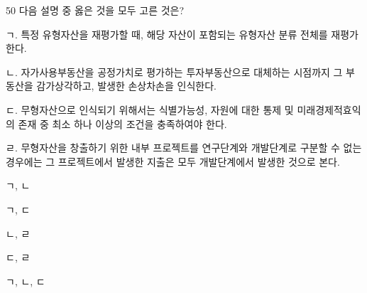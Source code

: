 \begin{question}{50}
다음 설명 중 옳은 것을 모두 고른 것은?
\begin{framedtext}
ㄱ. 특정 유형자산을 재평가할 때, 해당 자산이 포함되는 유형자산 분류 전체를 재평가한다. \par
ㄴ. 자가사용부동산을 공정가치로 평가하는 투자부동산으로 대체하는 시점까지 그 부동산을 감가상각하고, 발생한 손상차손을 인식한다. \par
ㄷ. 무형자산으로 인식되기 위해서는 식별가능성, 자원에 대한 통제 및 미래경제적효익의 존재 중 최소 하나 이상의 조건을 충족하여야 한다. \par
ㄹ. 무형자산을 창출하기 위한 내부 프로젝트를 연구단계와 개발단계로 구분할 수 없는 경우에는 그 프로젝트에서 발생한 지출은 모두 개발단계에서 발생한 것으로 본다. \par
\end{framedtext}
\begin{choices}
  \item ㄱ, ㄴ
  \item ㄱ, ㄷ
  \item ㄴ, ㄹ
  \item ㄷ, ㄹ
  \item ㄱ, ㄴ, ㄷ
\end{choices}
\end{question}
